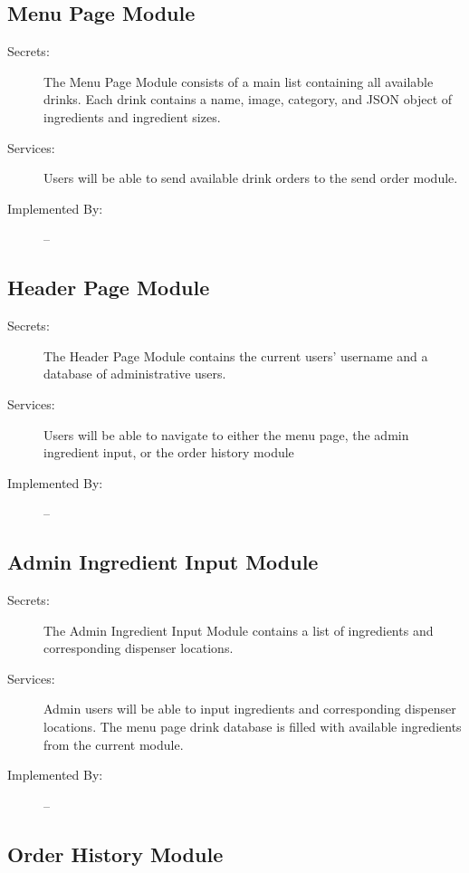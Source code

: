 \documentclass[12pt, titlepage]{article}
\begin{document}
\subsection{Menu Page Module}

\begin{description}
\item[Secrets:] The Menu Page Module consists of a main list containing all available drinks. Each drink contains a name, image, category, and JSON object of ingredients and ingredient sizes.
\item[Services:] Users will be able to send available drink orders to the send order module.
\item[Implemented By:] --
\end{description}

\subsection{Header Page Module}

\begin{description}
\item[Secrets:] The Header Page Module contains the current users' username and a database of administrative users.
\item[Services:] Users will be able to navigate to either the menu page, the admin ingredient input, or the order history module
\item[Implemented By:] --
\end{description}

\subsection{Admin Ingredient Input Module}

\begin{description}
\item[Secrets:] The Admin Ingredient Input Module contains a list of ingredients and corresponding dispenser locations.
\item[Services:] Admin users will be able to input ingredients and corresponding dispenser locations. The menu page drink database is filled with available ingredients from the current module.
\item[Implemented By:] --
\end{description}

\subsection{Order History Module}
\end{document}
